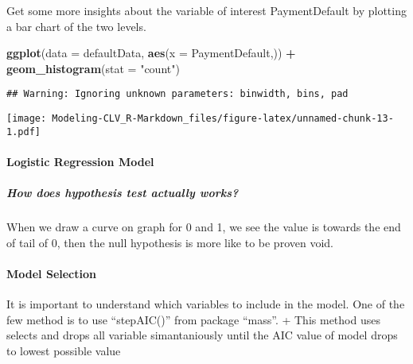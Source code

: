 \documentclass[
]{article}
\newenvironment{Shaded}{\begin{snugshade}}{\end{snugshade}}
\newcommand{\DataTypeTok}[1]{\textcolor[rgb]{0.13,0.29,0.53}{#1}}
\newcommand{\KeywordTok}[1]{\textcolor[rgb]{0.13,0.29,0.53}{\textbf{#1}}}
\newcommand{\NormalTok}[1]{#1}
\newcommand{\OperatorTok}[1]{\textcolor[rgb]{0.81,0.36,0.00}{\textbf{#1}}}
\newcommand{\StringTok}[1]{\textcolor[rgb]{0.31,0.60,0.02}{#1}}
\begin{document}
Get some more insights about the variable of interest PaymentDefault by
plotting a bar chart of the two levels.

\begin{Shaded}
\begin{Highlighting}[]
\KeywordTok{ggplot}\NormalTok{(}\DataTypeTok{data =}\NormalTok{ defaultData, }\KeywordTok{aes}\NormalTok{(}\DataTypeTok{x =}\NormalTok{ PaymentDefault,)) }\OperatorTok{+}
\StringTok{  }\KeywordTok{geom_histogram}\NormalTok{(}\DataTypeTok{stat =} \StringTok{"count"}\NormalTok{)}
\end{Highlighting}
\end{Shaded}

\begin{verbatim}
## Warning: Ignoring unknown parameters: binwidth, bins, pad
\end{verbatim}

\texttt{[image: Modeling-CLV\_R-Markdown\_files/figure-latex/unnamed-chunk-13-1.pdf]}

\hypertarget{logistic-regression-model}{%
\paragraph{Logistic Regression Model}\label{logistic-regression-model}}

\hypertarget{how-does-hypothesis-test-actually-works}{%
\subparagraph{How does hypothesis test actually
works?}\label{how-does-hypothesis-test-actually-works}}

When we draw a curve on graph for 0 and 1, we see the value is towards
the end of tail of 0, then the null hypothesis is more like to be proven
void.

\hypertarget{model-selection}{%
\paragraph{Model Selection}\label{model-selection}}

It is important to understand which variables to include in the model.
One of the few method is to use ``stepAIC()'' from package ``mass''. +
This method uses selects and drops all variable simantaniously until the
AIC value of model drops to lowest possible value
\end{document}
